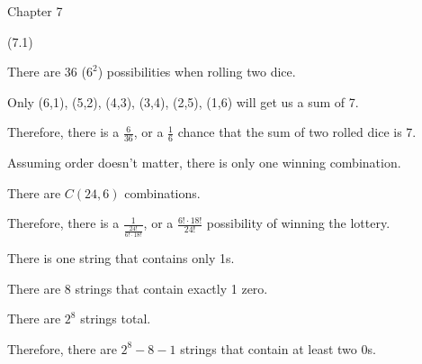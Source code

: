 \documentclass{exam}
\begin{document}
\begin{questions}

\vspace{10pt}
{\Large Chapter 7}
\vspace{2pt}

 (7.1)

\begin{center}
There are 36 (\(6^2\)) possibilities when rolling two dice.

Only (6,1), (5,2), (4,3), (3,4), (2,5), (1,6) will get us a sum of 7.

Therefore, there is a \(\frac{6}{36}\), or a \(\frac{1}{6}\) chance that the sum of two rolled dice is 7.
\end{center}


\begin{center}
Assuming order doesn't matter, there is only one winning combination.

There are \(C(24, 6)\) combinations.

Therefore, there is a \(\frac{1}{\frac{24!}{6! \cdot 18!}}\), or a \(\frac{6! \cdot 18!}{24!}\) possibility of winning the lottery.
\end{center}

\newpage


\begin{center}
There is one string that contains only 1s.

There are 8 strings that contain exactly 1 zero.

There are \(2^8\) strings total.

Therefore, there are \(2^8 - 8 - 1\) strings that contain at least two 0s.
\end{center}



\end{questions}
\end{document}
